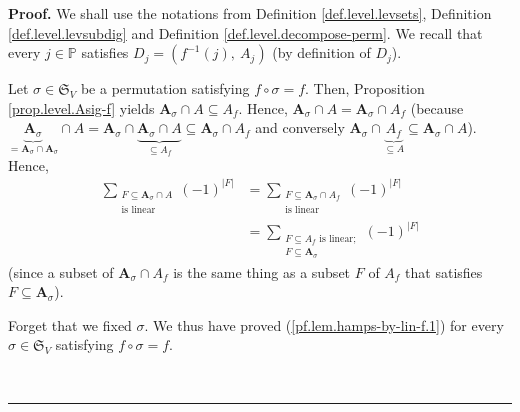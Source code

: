 \documentclass[numbers=enddot,12pt,final,onecolumn,notitlepage]{scrartcl}%
\numberwithin{exer}{section}
\theoremstyle{definition}
\newenvironment{proof}[1][Proof]{\noindent\textbf{#1.} }{\ \rule{0.5em}{0.5em}}
\let\sumnonlimits\sum
\renewcommand{\sum}{\sumnonlimits\limits}
\newenvironment{verlong}{}{}
\begin{document}
\begin{verlong}


\begin{proof}
We shall use the notations from Definition \ref{def.level.levsets}, Definition
\ref{def.level.levsubdig} and Definition \ref{def.level.decompose-perm}. We
recall that every $j\in\mathbb{P}$ satisfies $D_{j}=\left(  f^{-1}\left(
j\right)  ,\ A_{j}\right)  $ (by definition of $D_{j}$).

Let $\sigma\in\mathfrak{S}_{V}$ be a permutation satisfying $f\circ\sigma=f$.
Then, Proposition \ref{prop.level.Asig-f} yields $\mathbf{A}_{\sigma}\cap
A\subseteq A_{f}$. Hence, $\mathbf{A}_{\sigma}\cap A=\mathbf{A}_{\sigma}\cap
A_{f}$ (because $\underbrace{\mathbf{A}_{\sigma}}_{=\mathbf{A}_{\sigma}%
\cap\mathbf{A}_{\sigma}}\cap A=\mathbf{A}_{\sigma}\cap\underbrace{\mathbf{A}%
_{\sigma}\cap A}_{\subseteq A_{f}}\subseteq\mathbf{A}_{\sigma}\cap A_{f}$ and
conversely $\mathbf{A}_{\sigma}\cap\underbrace{A_{f}}_{\subseteq A}%
\subseteq\mathbf{A}_{\sigma}\cap A$). Hence,%
\begin{align}
\sum_{\substack{F\subseteq\mathbf{A}_{\sigma}\cap A\\\text{is linear}}}\left(
-1\right)  ^{\left\vert F\right\vert }  &  =\sum_{\substack{F\subseteq
\mathbf{A}_{\sigma}\cap A_{f}\\\text{is linear}}}\left(  -1\right)
^{\left\vert F\right\vert }\nonumber\\
&  =\sum_{\substack{F\subseteq A_{f}\text{ is linear};\\F\subseteq
\mathbf{A}_{\sigma}}}\left(  -1\right)  ^{\left\vert F\right\vert }
\label{pf.lem.hamps-by-lin-f.1}%
\end{align}
(since a subset of $\mathbf{A}_{\sigma}\cap A_{f}$ is the same thing as a
subset $F$ of $A_{f}$ that satisfies $F\subseteq\mathbf{A}_{\sigma}$).

Forget that we fixed $\sigma$. We thus have proved
(\ref{pf.lem.hamps-by-lin-f.1}) for every $\sigma\in\mathfrak{S}_{V}$
satisfying $f\circ\sigma=f$.


\end{proof}
\end{verlong}
\end{document}
